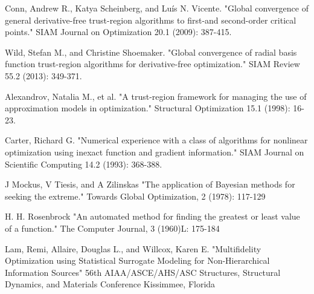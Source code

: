 \documentclass[a4paper,onecolumn]{article}
\theoremstyle{remark}
\begin{document}
\begin{thebibliography}{1}
Conn, Andrew R., Katya Scheinberg, and Luís N. Vicente. 
"Global convergence of general derivative-free trust-region algorithms to first-and second-order critical points." 
SIAM Journal on Optimization 20.1 (2009): 387-415.

Wild, Stefan M., and Christine Shoemaker. 
"Global convergence of radial basis function trust-region algorithms for derivative-free optimization." 
SIAM Review 55.2 (2013): 349-371.

Alexandrov, Natalia M., et al. "A trust-region framework for managing the use of approximation models in optimization." Structural Optimization 15.1 (1998): 16-23.

Carter, Richard G. 
"Numerical experience with a class of algorithms for nonlinear optimization using inexact function and gradient information." 
SIAM Journal on Scientific Computing 14.2 (1993): 368-388.

J Mockus, V Tiesis, and A Zilinskas
"The application of Bayesian methods for seeking the extreme."
Towards Global Optimization, 2 (1978): 117-129

H. H. Rosenbrock
"An automated method for finding the greatest or least value of a function."
The Computer Journal, 3 (1960)L: 175-184

Lam, Remi, Allaire, Douglas L., and Willcox, Karen E.
"Multifidelity Optimization using Statistical Surrogate Modeling for Non-Hierarchical 
Information Sources"
56th AIAA/ASCE/AHS/ASC Structures, Structural Dynamics, and Materials Conference Kissimmee, Florida

\end{thebibliography}
\end{document}
